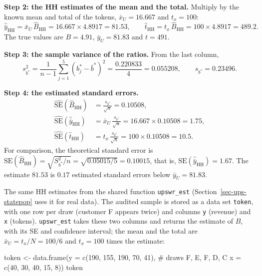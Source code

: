 \documentclass[
  letterpaper,
  DIV=11,
  numbers=noendperiod]{scrreprt}
\newenvironment{Shaded}{\begin{snugshade}}{\end{snugshade}}
\newcommand{\AttributeTok}[1]{\textcolor[rgb]{0.40,0.45,0.13}{#1}}
\newcommand{\CommentTok}[1]{\textcolor[rgb]{0.37,0.37,0.37}{#1}}
\newcommand{\DecValTok}[1]{\textcolor[rgb]{0.68,0.00,0.00}{#1}}
\newcommand{\FunctionTok}[1]{\textcolor[rgb]{0.28,0.35,0.67}{#1}}
\newcommand{\NormalTok}[1]{\textcolor[rgb]{0.00,0.23,0.31}{#1}}
\newcommand{\OtherTok}[1]{\textcolor[rgb]{0.00,0.23,0.31}{#1}}
\renewcommand{\[}{\begin{equation}}
\renewcommand{\]}{\end{equation}}
\begin{document}
\textbf{Step 2: the HH estimates of the mean and the total.} Multiply by
the known mean and total of the tokens, \(\bar{x}_U=16.667\) and
\(t_x=100\): \[
\hat{\bar{y}}_{\mathrm{HH}}=\bar{x}_U\,\hat{B}_{\mathrm{HH}}=16.667\times 4.8917=81.53,\qquad
\hat{t}_{\mathrm{HH}}=t_x\,\hat{B}_{\mathrm{HH}}=100\times 4.8917=489.2.
\] The true values are \(B=4.91\), \(\bar{y}_U=81.83\) and \(t=491\).

\textbf{Step 3: the sample variance of the ratios.} From the last
column, \[
s_{b^*}^2=\frac{1}{n-1}\sum_{j=1}^5\left(b_j^*-\bar{b}^*\right)^2=\frac{0.220833}{4}
=0.055208,\qquad s_{b^*}=0.23496.
\]

\textbf{Step 4: the estimated standard errors.} \[
\begin{aligned}
\widehat{\mathrm{SE}}(\hat{B}_{\mathrm{HH}})&=\frac{s_{b^*}}{\sqrt{n}}=0.10508,\\
\widehat{\mathrm{SE}}(\hat{\bar{y}}_{\mathrm{HH}})&=\bar{x}_U\,\frac{s_{b^*}}{\sqrt{n}}
=16.667\times0.10508=1.75,\\
\widehat{\mathrm{SE}}(\hat{t}_{\mathrm{HH}})&=t_x\,\frac{s_{b^*}}{\sqrt{n}}=100\times0.10508=10.5.
\end{aligned}
\] For comparison, the theoretical standard error is
\(\mathrm{SE}(\hat{B}_{\mathrm{HH}})=\sqrt{S_{b^*}^2/n}=\sqrt{0.05015/5}=0.10015\),
that is, \(\mathrm{SE}(\hat{\bar{y}}_{\mathrm{HH}})=1.67\). The estimate
\(81.53\) is \(0.17\) estimated standard errors below
\(\bar{y}_U=81.83\).

The same HH estimates from the shared function \texttt{upswr\_est}
(Section~\ref{sec-ups-statepop} uses it for real data). The audited
sample is stored as a data set \texttt{token}, with one row per draw
(customer F appears twice) and columns \texttt{y} (revenue) and
\texttt{x} (tokens). \texttt{upswr\_est} takes these two columns and
returns the estimate of \(B\), with its SE and confidence interval; the
mean and the total are \(\bar{x}_U=t_x/N=100/6\) and \(t_x=100\) times
the estimate:

\begin{Shaded}
\begin{Highlighting}[]
\NormalTok{token }\OtherTok{\textless{}{-}} \FunctionTok{data.frame}\NormalTok{(}\AttributeTok{y =} \FunctionTok{c}\NormalTok{(}\DecValTok{190}\NormalTok{, }\DecValTok{155}\NormalTok{, }\DecValTok{190}\NormalTok{, }\DecValTok{70}\NormalTok{, }\DecValTok{41}\NormalTok{),   }\CommentTok{\# draws F, E, F, D, C}
                    \AttributeTok{x =} \FunctionTok{c}\NormalTok{(}\DecValTok{40}\NormalTok{, }\DecValTok{30}\NormalTok{, }\DecValTok{40}\NormalTok{, }\DecValTok{15}\NormalTok{, }\DecValTok{8}\NormalTok{))}
\NormalTok{token}
\end{Highlighting}
\end{Shaded}
\end{document}
